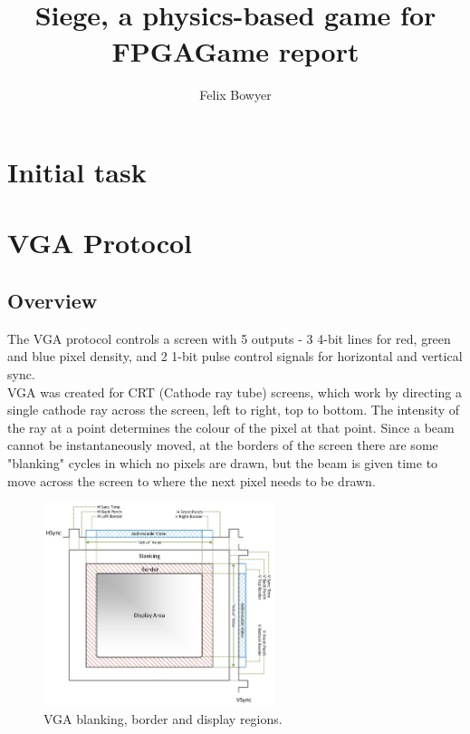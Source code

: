 \documentclass{ifda}
\title{\\[1cm] Siege, a physics-based game for FPGA\newline Game report}
\author{Felix Bowyer}
\begin{document}
\maketitle

\thispagestyle{pagefirst}

\tableofcontents

\newpage


\ledgernotes

\section{Initial task}

\section{VGA Protocol}
\subsection{Overview}
The VGA protocol controls a screen with 5 outputs - 3 4-bit lines for red, green and blue pixel density, and 2 1-bit pulse control signals for horizontal and vertical sync.\\

VGA was created for CRT (Cathode ray tube) screens, which work by directing a single cathode ray across the screen, left to right, top to bottom. The intensity of the ray at a point determines the colour of the pixel at that point. Since a beam cannot be instantaneously moved, at the borders of the screen there are some "blanking" cycles in which no pixels are drawn, but the beam is given time to move across the screen to where the next pixel needs to be drawn.\\

\begin{figure}[h]
    \centering
    \includegraphics[width=0.6\textwidth]{ VESA_TimingDiagram.jpg }
    \caption{VGA blanking, border and display regions.}
    \label{fig:vga_sync}
\end{figure}
\end{document}
